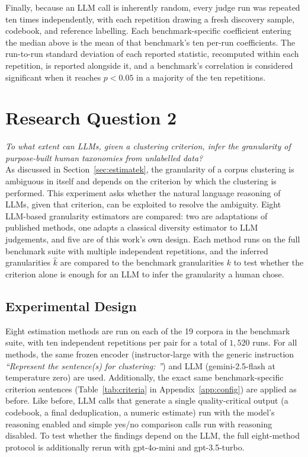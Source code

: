 \documentclass[11pt,a4paper,oneside]{report}
\begin{document}
Finally, because an LLM call is inherently random, every judge run was repeated ten times independently, with each repetition drawing a fresh discovery sample, codebook, and reference labelling. Each benchmark-specific coefficient entering the median above is the mean of that benchmark's ten per-run coefficients. The run-to-run standard deviation of each reported statistic, recomputed within each repetition, is reported alongside it, and a benchmark's correlation is considered significant when it reaches $p < 0.05$ in a majority of the ten repetitions.

\section{Research Question 2}

\emph{To what extent can LLMs, given a clustering criterion, infer the granularity of purpose-built human taxonomies from unlabelled data?}\\

As discussed in Section~\ref{sec:estimatek}, the granularity of a corpus clustering is ambiguous in itself and depends on the criterion by which the clustering is performed. This experiment asks whether the natural language reasoning of LLMs, given that criterion, can be exploited to resolve the ambiguity. Eight LLM-based granularity estimators are compared: two are adaptations of published methods, one adapts a classical diversity estimator to LLM judgements, and five are of this work's own design. Each method runs on the full benchmark suite with multiple independent repetitions, and the inferred granularities $\hat{k}$ are compared to the benchmark granularities $k$ to test whether the criterion alone is enough for an LLM to infer the granularity a human chose.

\subsection{Experimental Design}\label{sec:RQ2_DESIGN}

Eight estimation methods are run on each of the 19 corpora in the benchmark suite, with ten independent repetitions per pair for a total of $1{,}520$ runs. For all methods, the same frozen encoder ({\small\ttfamily instructor-large} with the generic instruction \emph{``Represent the sentence(s) for clustering: ''}) and LLM ({\small\ttfamily gemini-2.5-flash} at temperature zero) are used. Additionally, the exact same benchmark-specific criterion sentences (Table~\ref{tab:criteria} in Appendix~\ref{app:config}) are applied as before. Like before, LLM calls that generate a single quality-critical output (a codebook, a final deduplication, a numeric estimate) run with the model's reasoning enabled and simple yes/no comparison calls run with reasoning disabled. To test whether the findings depend on the LLM, the full eight-method protocol is additionally rerun with {\small\ttfamily gpt-4o-mini} and {\small\ttfamily gpt-3.5-turbo}.
\end{document}
